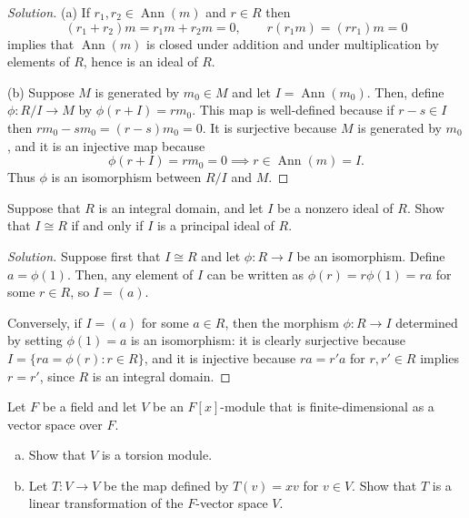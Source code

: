 \documentclass[10pt]{article}
\providecommand{\ii}{\item}
\newenvironment{soln}{\begin{proof}[Solution]}{\end{proof}}
\providecommand{\ann}{\operatorname{Ann}}
\begin{document}
\begin{soln}
    (a) If $r_1,r_2\in\ann(m)$ and $r\in R$ then
    \begin{equation*}
	(r_1+r_2)m = r_1m + r_2m = 0,\qquad
	r(r_1m) = (rr_1)m = 0
    \end{equation*}
    implies that $\ann(m)$ is closed under addition
    and under multiplication by elements of $R$, hence is an ideal of $R$.
    \ii

    (b) Suppose $M$ is generated by $m_0\in M$
    and let $I = \ann(m_0)$. Then, define $\phi\colon R/I\to M$
    by $\phi(r + I) = rm_0$. This map is well-defined because
    if $r-s\in I$ then $rm_0 - sm_0 = (r-s)m_0 = 0$.
    It is surjective because $M$ is generated by $m_0$,
    and it is an injective map because
    \begin{equation*}
        \phi(r + I) = rm_0 = 0\implies r\in\ann(m) = I.
    \end{equation*}
    Thus $\phi$ is an isomorphism between $R/I$ and $M$.
\end{soln}

\begin{problem}
    Suppose that $R$ is an integral domain,
    and let $I$ be a nonzero ideal of $R$.
    Show that $I\cong R$ if and only if $I$ is a principal ideal of $R$.
\end{problem}

\begin{soln}
    Suppose first that $I\cong R$ and let $\phi\colon R\to I$ be an isomorphism.
    Define $a = \phi(1)$. Then, any element of $I$ can be written as
    $\phi(r) = r\phi(1) = ra$ for some $r\in R$, so $I = (a)$.

    Conversely, if $I = (a)$ for some $a\in R$, then the morphism
    $\phi\colon R\to I$ determined by setting $\phi(1) = a$
    is an isomorphism: it is clearly surjective because
    $I = \{ra = \phi(r) : r\in R\}$, and it is injective because
    $ra = r'a$ for $r,r'\in R$ implies $r = r'$, since $R$ is an integral domain.
\end{soln}

\begin{problem}
    Let $F$ be a field and let $V$ be an $F[x]$-module
    that is finite-dimensional as a vector space over $F$.
    \begin{enumerate}[(a)]
        \ii Show that $V$ is a torsion module.
	\ii Let $T\colon V\to V$ be the map defined by
	$T(v) = xv$ for $v\in V$. Show that $T$ is a linear transformation
	of the $F$-vector space $V$.
    \end{enumerate}
\end{problem}
\end{document}

